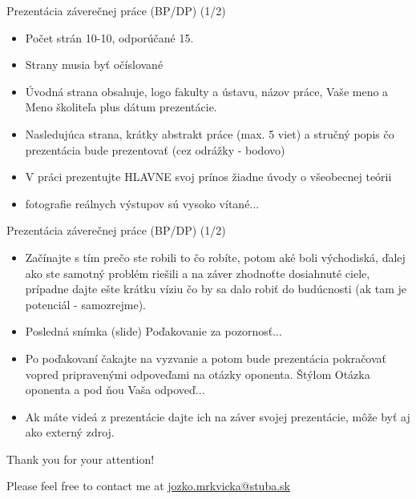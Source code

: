 \documentclass{beamer}
\begin{document}
\begin{frame}{Prezentácia záverečnej práce (BP/DP) (1/2)}
\begin{itemize}
  \item Počet strán 10-10, odporúčané 15.
  \item Strany musia byť očíslované
 \item Úvodná strana obsahuje, logo fakulty a ústavu, názov práce, Vaše meno a Meno školiteľa plus dátum prezentácie.
 \item Nasledujúca strana, krátky abstrakt práce (max. 5 viet) a stručný popis čo prezentácia bude prezentovať (cez odrážky - bodovo)
 \item V práci prezentujte HLAVNE svoj prínos žiadne úvody o všeobecnej teórii
  \item fotografie reálnych výstupov sú vysoko vítané...

\end{itemize}

\end{frame}


\begin{frame}{Prezentácia záverečnej práce (BP/DP) (1/2)}
\begin{itemize}
 \item Začínajte s tím prečo ste robili to čo robíte, potom aké boli východiská, ďalej ako ste samotný problém riešili a na záver zhodnoťte dosiahnuté ciele, prípadne dajte ešte krátku víziu čo by sa dalo robiť do budúcnosti (ak tam je potenciál - samozrejme).
 \item Posledná snímka (slide) Poďakovanie za pozornosť...
 \item Po poďakovaní čakajte na vyzvanie a potom bude prezentácia pokračovať vopred pripravenými odpoveďami na otázky oponenta. Štýlom Otázka oponenta a pod ňou Vaša odpoveď...
 \item Ak máte videá z prezentácie dajte ich na záver svojej prezentácie, môže byť aj ako externý zdroj.
\end{itemize}

\end{frame}


\begin{frame}
\vspace{8em}
{\Huge Thank you for your attention!}

\vspace{8em}
Please feel free to contact me at
\url{jozko.mrkvicka@stuba.sk}
\end{frame}
\end{document}
